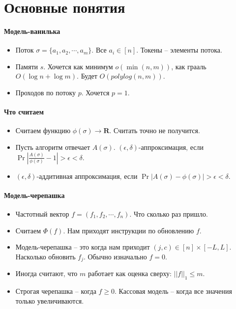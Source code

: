 \section{Основные понятия} %
\label{sec:basics}

\paragraph{Модель-ванилька} %
\label{par:vanilla_model}
\begin{itemize}
	\item Поток $\sigma = \{a_1, a_2, \cdots, a_m \}$. Все $a_i \in [n]$. Токены -- элементы потока.
	\item Памяти $s$. Хочется как минимум $o(\min(n, m))$, как грааль $O(\log n + \log m)$. Будет $O(polylog(n, m))$.
	\item Проходов по потоку $p$. Хочется $p = 1$.
\end{itemize}

\paragraph{Что считаем} %
\label{par:quality_function}
\begin{itemize}
	\item Считаем функцию $\phi(\sigma) \rightarrow \mathbf{R}$. Считать точно не получится. 
	\item Пусть алгоритм отвечает $A(\sigma)$. $(\epsilon, \delta)$-аппроксимация, если $\Pr{\left|\frac{A(\sigma)}{\phi(\sigma)} - 1\right| > \epsilon} < \delta$.
	\item $(\epsilon, \delta)$-аддитивная аппроксимация, если $\Pr{\left| A(\sigma) - \phi(\sigma) \right| > \epsilon} < \delta$.		
\end{itemize}

\paragraph{Модель-черепашка} %
\label{par:turnstile_model}
\begin{itemize}
	\item Частотный вектор $f = (f_1, f_2, \cdots, f_n)$. Что сколько раз пришло.
	\item Считаем $\Phi(f)$. Нам приходят инструкции по обновлению $f$. 
	\item Модель-черепашка -- это когда нам приходит $(j, c) \in [n] \times [-L, L]$. Насколько обновить $f_j$. Обычно изначально $f = 0$.
	\item Иногда считают, что $m$ работает как оценка сверху: $||f||_1 \leq m$.
	\item Строгая черепашка -- когда $f \geq 0$. Кассовая модель -- когда все значения только увеличиваются.
\end{itemize}

